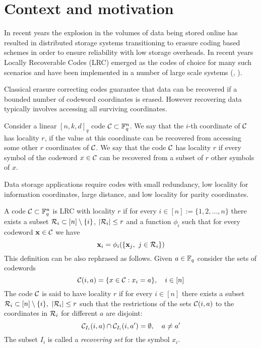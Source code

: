 \chapter{Context and motivation}

In recent years the explosion in the volumes of data being stored online has resulted in distributed storage systems transitioning to erasure coding based schemes in order to ensure reliability with low storage overheads. In recent years Locally Recoverable Codes (LRC) emerged as the codes of choice for many such scenarios and have been implemented in a number of large scale systems (\cite{azure}, \cite{hadoop} ).

Classical erasure correcting codes guarantee that data can be recovered if a bounded number of codeword coordinates is erased. However recovering data typically involves accessing all surviving coordinates.

Consider a linear $[n,k,d]_q$ code ${\mathcal C} \subset {\mathbb F}_q^n$. We say that the $i$-th coordinate of ${\mathcal C}$ has locality $r$, if the value at this coordinate can be recovered from accessing some other $r$ coordinates of ${\mathcal C}$. We say that the code ${\mathcal C}$ has locality $r$ if every symbol of the codeword $x \in {\mathcal C}$ can be recovered from a subset of $r$ other symbols of $x$.

Data storage applications require codes with small redundancy, low locality for information coordinates, large distance, and low locality for parity coordinates.


\begin{defn}
A code ${\mathcal C} \subset {\mathbb F}_q^n$ is LRC with locality $r$ if for every $i \in [n] := \{1,2,...,n\}$ there exists a subset ${\mathcal R}_i \subset [n] \setminus \{i\}$, $\left\vert {{\mathcal R}_i} \right\vert \leq r$ and a function $\phi_i$ such that for every codeword $\mathbf{x} \in {\mathcal C}$ we have
\begin{equation}
\x_i = \phi_i(\{\x_j, \ j \in \R_i \})
\end{equation}
This definition can be also rephrased as follows. Given $a \in {\mathbb F}_q$ consider the sets of codewords
\[{\mathcal C}(i,a) = \{ x \in {\mathcal C} : x_i = a\}, \quad i \in [n]\]
The code ${\mathcal C}$ is said to have locality $r$ if for every $i \in [n]$ there exists a subset ${\mathcal R}_i \subset [n] \setminus \{i\}, \ \left\vert {{\mathcal R}_i} \right\vert \leq r$ such that the restrictions of the sets ${\mathcal C}(i,a)$ to the coordinates in ${\mathcal R}_i$ for different $a$ are disjoint:
    \begin{equation}
        {\mathcal C}_{I_i}(i,a) \cap {\mathcal C}_{I_i}(i,a') = \emptyset, \quad a \neq a'
    \end{equation}
The subset $I_i$ is called a \textit{recovering set} for the symbol $x_i$.
\end{defn}


